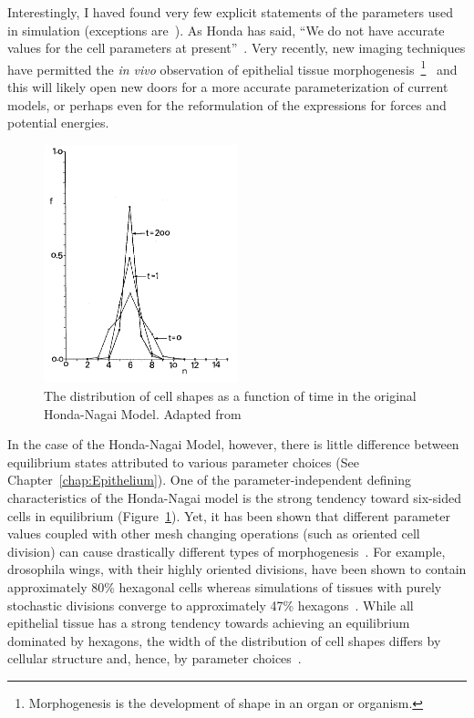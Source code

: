 Interestingly, I haved found very few explicit statements of the parameters used in simulation (exceptions are~\cite{WoundHealing, ChasteMain, NewOkuda}). As Honda has said, ``We do not have accurate values for the cell parameters at present''~\cite{Honda3D}.  Very recently, new imaging techniques have permitted the \emph{in vivo} observation of epithelial tissue morphogenesis~\footnote{Morphogenesis is the development of shape in an organ or organism.}~\cite{Sokolow, Xiong} and this will likely open new doors for a more accurate parameterization of current models, or perhaps even for the reformulation of the expressions for forces and potential energies. 

\begin{figure}[ht]
\centering
\includegraphics[width=0.5\textwidth]{../diagrams/distibutionHonda.png}
\caption[Distribution of Cell Shapes]{The distribution of cell shapes as a function of time in the original Honda-Nagai Model. Adapted from~\cite{HondaNagai}}
\label{fig:hnm}
\end{figure}

In the case of the Honda-Nagai Model, however, there is little difference between equilibrium states attributed to various parameter choices (See Chapter~\ref{chap:Epithelium}). One of the parameter-independent defining characteristics of the Honda-Nagai model is the strong tendency toward six-sided cells in equilibrium (Figure~\ref{fig:hnm}).  Yet, it has been shown that different parameter values coupled with other mesh changing operations (such as oriented cell division) can cause drastically different types of morphogenesis~\cite{Overview}. For example, drosophila wings, with their highly oriented divisions, have been shown to contain approximately 80\% hexagonal cells whereas simulations of tissues with purely stochastic divisions converge to  approximately 47\% hexagons~\cite{EpithelialTopology}. While all epithelial tissue has a strong tendency towards achieving an equilibrium dominated by hexagons, the width of the distribution of cell shapes differs by cellular structure and, hence, by parameter choices~\cite{Soap}. 


